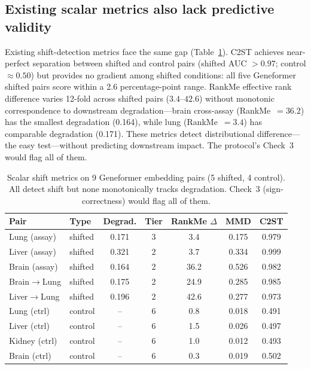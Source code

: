 \documentclass[10pt,letterpaper]{article}
\begin{document}
\subsection{Existing scalar metrics also lack predictive validity}

Existing shift-detection metrics face the same gap (Table~\ref{tab:scalar}). C2ST achieves near-perfect separation between shifted and control pairs (shifted AUC $> 0.97$; control $\approx 0.50$) but provides no gradient among shifted conditions: all five Geneformer shifted pairs score within a 2.6 percentage-point range. RankMe effective rank difference varies 12-fold across shifted pairs ($3.4$--$42.6$) without monotonic correspondence to downstream degradation---brain cross-assay (RankMe~$= 36.2$) has the smallest degradation (0.164), while lung (RankMe~$= 3.4$) has comparable degradation (0.171). These metrics detect distributional difference---the easy test---without predicting downstream impact. The protocol's Check~3 would flag all of them.

\begin{table}[t]
\centering
\caption{Scalar shift metrics on 9 Geneformer embedding pairs (5 shifted, 4 control). All detect shift but none monotonically tracks degradation. Check~3 (sign-correctness) would flag all of them.}
\label{tab:scalar}
\small
\begin{tabular}{@{}llccccc@{}}
\toprule
Pair & Type & Degrad. & Tier & RankMe $\Delta$ & MMD & C2ST \\
\midrule
Lung (assay)  & shifted & 0.171 & 3 & 3.4  & 0.175 & 0.979 \\
Liver (assay) & shifted & 0.321 & 2 & 3.7  & 0.334 & 0.999 \\
Brain (assay) & shifted & 0.164 & 2 & 36.2 & 0.526 & 0.982 \\
Brain$\to$Lung  & shifted & 0.175 & 2 & 24.9 & 0.285 & 0.985 \\
Liver$\to$Lung  & shifted & 0.196 & 2 & 42.6 & 0.277 & 0.973 \\
\midrule
Lung (ctrl)   & control & -- & 6 & 0.8 & 0.018 & 0.491 \\
Liver (ctrl)  & control & -- & 6 & 1.5 & 0.026 & 0.497 \\
Kidney (ctrl) & control & -- & 6 & 1.0 & 0.012 & 0.493 \\
Brain (ctrl)  & control & -- & 6 & 0.3 & 0.019 & 0.502 \\
\bottomrule
\end{tabular}
\end{table}
\end{document}
